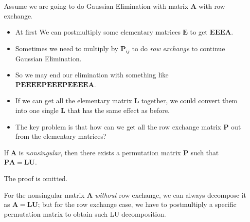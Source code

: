 Assume we are going to do
Gaussian Elimination with matrix $\bm A$ with row exchange. 
\begin{itemize}
\item
At first We can postmultiply some elementary matrices $\bm E$ to get
$\bm{EEEA}$.
\item
Sometimes we need to multiply by $\bm P_{ij}$ to do \textit{row exchange} to continue Gaussian
Elimination.
\item
So we may end our elimination with something like $\bm{PEEEEPEEEPEEEEA}$.
\item
If we can get all the elementary matrix $\bm L$ together, we could convert them into one single $\bm L$ that has
the same effect as before.
\item
The key problem is that how can we get all the row exchange matrix $\bm P$ out from the elementary matrices?
\end{itemize}
\begin{theorem}
If $\bm A$ is \textit{nonsingular}, then there exists a permutation matrix $\bm P$ such that $\bm{PA}=\bm{LU}$.
\end{theorem}
The proof is omitted.
\begin{remark}
For the nonsingular matrix $\bm A$ \emph{without} row exchange, we can always decompose it as $\bm A=\bm L\bm U$; but for the row exchange case, we have to postmultiply a specific permutation matrix to obtain such LU decomposition.
\end{remark}
